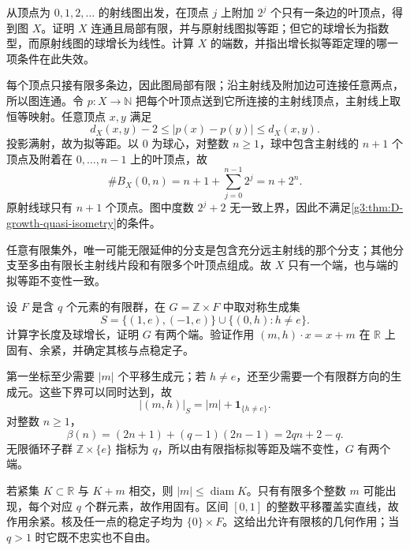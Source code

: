 \begin{exercise}\label{g3:ex:D-unbounded-valence-growth}
	从顶点为 \(0,1,2,\ldots\) 的射线图出发，在顶点 \(j\) 上附加 \(2^j\) 个只有一条边的叶顶点，得到图 \(X\)。证明 \(X\) 连通且局部有限，并与原射线图拟等距；但它的球增长为指数型，而原射线图的球增长为线性。计算 \(X\) 的端数，并指出增长拟等距定理的哪一项条件在此失效。
\end{exercise}
\begin{solution}
	每个顶点只接有限多条边，因此图局部有限；沿主射线及附加边可连接任意两点，所以图连通。令 \(p:X\rightarrow\mathbb N\) 把每个叶顶点送到它所连接的主射线顶点，主射线上取恒等映射。任意顶点 \(x,y\) 满足
	\[
		d_X(x,y)-2\le |p(x)-p(y)|\le d_X(x,y).
	\]
	投影满射，故为拟等距。以 \(0\) 为球心，对整数 \(n\ge1\)，球中包含主射线的 \(n+1\) 个顶点及附着在 \(0,\ldots,n-1\) 上的叶顶点，故
	\[
		\#B_X(0,n)=n+1+\sum_{j=0}^{n-1}2^j=n+2^n.
	\]
	原射线球只有 \(n+1\) 个顶点。图中度数 \(2^j+2\) 无一致上界，因此不满足\cref{g3:thm:D-growth-quasi-isometry}的条件。

	任意有限集外，唯一可能无限延伸的分支是包含充分远主射线的那个分支；其他分支至多由有限长主射线片段和有限多个叶顶点组成。故 \(X\) 只有一个端，也与端的拟等距不变性一致。
\end{solution}

\begin{exercise}\label{g3:ex:D-finite-factor-line}
	设 \(F\) 是含 \(q\) 个元素的有限群，在 \(G=\mathbb Z\times F\) 中取对称生成集
	\[
		S=\{(1,e),(-1,e)\}\cup\{(0,h):h\ne e\}.
	\]
	计算字长度及球增长，证明 \(G\) 有两个端。验证作用 \((m,h)\cdot x=x+m\) 在 \(\mathbb R\) 上固有、余紧，并确定其核与点稳定子。
\end{exercise}
\begin{solution}
	第一坐标至少需要 \(|m|\) 个平移生成元；若 \(h\ne e\)，还至少需要一个有限群方向的生成元。这些下界可以同时达到，故
	\[
		|(m,h)|_S=|m|+\mathbf1_{\{h\ne e\}}.
	\]
	对整数 \(n\ge1\)，
	\[
		\beta(n)=(2n+1)+(q-1)(2n-1)=2qn+2-q.
	\]
	无限循环子群 \(\mathbb Z\times\{e\}\) 指标为 \(q\)，所以由有限指标拟等距及端不变性，\(G\) 有两个端。

	若紧集 \(K\subset\mathbb R\) 与 \(K+m\) 相交，则 \(|m|\le\operatorname{diam}K\)。只有有限多个整数 \(m\) 可能出现，每个对应 \(q\) 个群元素，故作用固有。区间 \([0,1]\) 的整数平移覆盖实直线，故作用余紧。核及任一点的稳定子均为 \(\{0\}\times F\)。这给出允许有限核的几何作用；当 \(q>1\) 时它既不忠实也不自由。
\end{solution}

